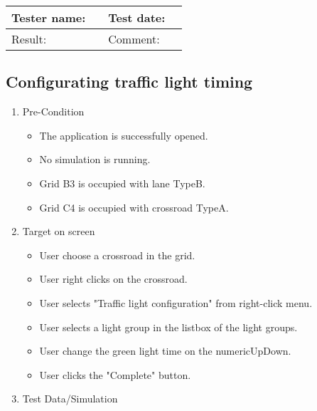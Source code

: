 \begin{enumerate}
\begin{tabularx}{\textwidth}{|X|X|p{2.5cm}|}
	\end{tabularx}
\end{enumerate}

\begin{tabularx}{\textwidth}{|p{3cm}X|p{3cm}X|}\hline
	Tester name: &  & Test date: & \\\hline
	Result: &   \pass & Comment: & \\\hline
\end{tabularx}

\newpage

\subsection{Configurating traffic light timing}

\begin{enumerate}
	\item Pre-Condition
	\begin{itemize}
		\item The application is successfully opened.
		\item No simulation is running.
		\item Grid B3 is occupied with lane TypeB.
		\item Grid C4 is occupied with crossroad TypeA.
	\end{itemize}
	\item Target on screen
	\begin{itemize}
		\item User choose a crossroad in the grid.
		\item User right clicks on the crossroad.
		\item User selects "Traffic light configuration" from right-click menu.
		\item User selects a light group in the listbox of the light groups.
		\item User change the green light time on the numericUpDown.
		\item User clicks the "Complete" button. 
	\end{itemize}
	\item Test Data/Simulation
	

\end{enumerate}
